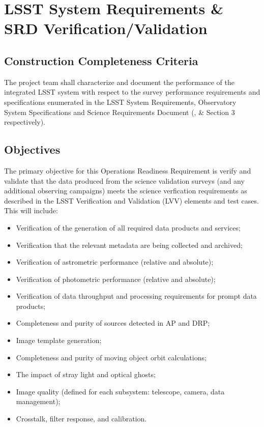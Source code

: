 \section{LSST System Requirements \& SRD Verification/Validation}  \label{sec:srd}

\subsection{Construction Completeness Criteria}
The project team shall characterize and document the performance of the integrated LSST system with respect to the survey performance requirements and specifications enumerated in the LSST System Requirements, Observatory System Specifications and Science Requirements Document (,  \&  Section 3 respectively).

\subsection{Objectives}

The primary objective for this Operations Readiness Requirement is verify and validate that the data produced from the science validation surveys (and any additional observing campaigns) meets the science verfication requirements as described in the LSST Verification and Validation (LVV) elements and test cases. This will include:

\begin{itemize}

	\item Verification of the generation of all required data products and services;
 	\item Verification that the relevant metadata are being collected and archived;
	\item Verification of astrometric performance (relative and absolute);
	\item Verification of photometric performance (relative and absolute);
	\item Verification of data throughput and processing requirements for prompt data products;  
	\item Completeness and purity of sources detected in AP and DRP;
	\item Image template generation;
	\item Completeness and purity of moving object orbit calculations;
	\item The impact of stray light and optical ghosts;
	\item Image quality (defined for each subsystem: telescope, camera, data management);
	\item Crosstalk, filter response, and calibration.
	
\end{itemize}

